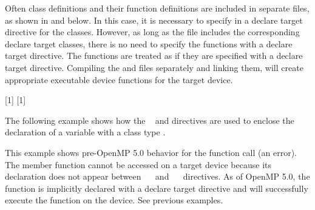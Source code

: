 
\begin{figure}[t!]
\end{figure}

Often class definitions and their function definitions are included in separate files,
as shown in  and  below.
In this case, it is necessary to specify in a declare target directive for the classes.
However, as long as the  file includes the corresponding declare target classes,
there is no need to specify the functions with a declare target directive.
The functions are treated as if they are specified with a declare target directive.
Compiling the  and  files 
separately and linking them, will create appropriate executable device functions for the target device.

\smallskip
{}[1]
\smallskip
{}[1]

\begin{figure}[t!]
\end{figure}

The following example shows how the ~  and  
  directives are used to enclose the declaration 
of a variable  with a class type . 

This example shows pre-OpenMP 5.0 behavior for the  function call (an error).
The member function  cannot be accessed on a target device because its 
declaration does not appear between ~~ and 
~~ directives. As of OpenMP 5.0, the
function is implicitly declared with a declare target directive 
and will successfully execute the function on the device.  See previous examples.

